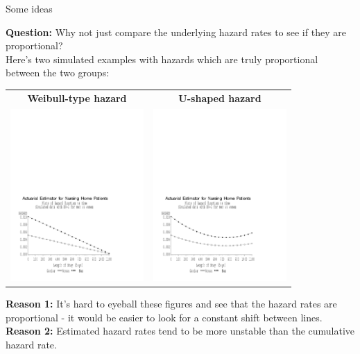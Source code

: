 \documentclass[envcountsect, 10pt, portrait, palatino]{beamer}
\begin{document}
\begin{frame}{Some ideas}

{\bf Question:}  Why not just compare the underlying hazard rates to
see if they are proportional?
\\[2ex]
Here's two simulated examples with hazards which are truly
proportional between the two groups:
\begin{center}
\begin{tabular}{cc}
{\bf Weibull-type hazard} & {\bf U-shaped hazard}\\
\includegraphics[width=2in]{hazards_sim1.pdf} &
\includegraphics[width=2in]{hazards_sim2.pdf}
\end{tabular}
\end{center}
\end{frame}
\begin{frame}

{\bf Reason 1:} It's hard to eyeball these figures and see that
the hazard rates are proportional - it would be easier to look for
a constant shift between lines.~\\[2ex]

{\bf Reason 2:} Estimated hazard rates tend to be more unstable than the
cumulative hazard rate.
\end{frame}
\end{document}
